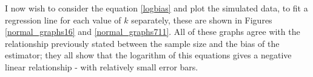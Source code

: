 \documentclass[12pt]{report}
\begin{document}
I now wish to consider the equation \ref{logbias} and plot the simulated data, to fit a regression line for each value of $k$ separately, these are shown in Figures \ref{normal_graphs16} and \ref{normal_graphs711}. All of these graphs agree with the relationship previously stated between the sample size and the bias of the estimator; they all show that the logarithm of this equations gives a negative linear relationship - with relatively small error bars.

\begin{figure}
\    
\end{figure}
\end{document}
